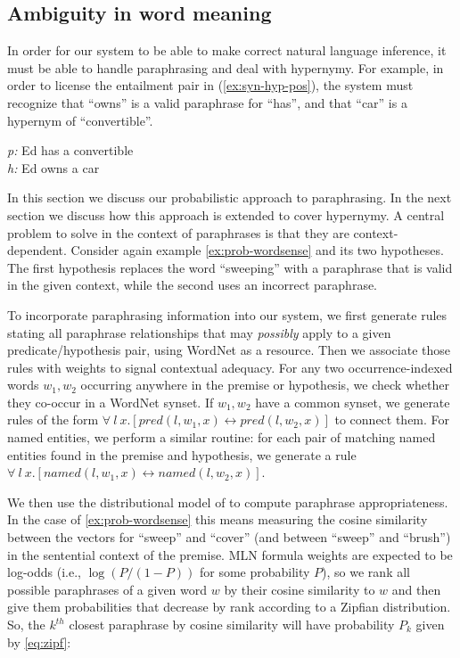 \subsection*{Ambiguity in word meaning}

In order for our system to be able to make correct natural language inference,
it must be able to handle paraphrasing and deal with hypernymy.  For example,
in order to license the entailment pair in (\ref{ex:syn-hyp-pos}), the system must
recognize that ``owns'' is a valid paraphrase for ``has'', and that ``car'' is a hypernym
of ``convertible''.

\begin{example}\label{ex:syn-hyp-pos}
{\it p:} Ed has a convertible \\
{\it h:} Ed owns a car
\end{example}

In this section we discuss our probabilistic approach to paraphrasing.
In the next section we discuss how this approach is extended to cover
hypernymy. A central problem to solve in the context of paraphrases is
that they are context-dependent. Consider again example
\eqref{ex:prob-wordsense} and its two hypotheses.  The first
hypothesis replaces the word ``sweeping'' with a paraphrase that is
valid in the given context, while the second uses an incorrect
paraphrase. 

To incorporate paraphrasing information into our system, we first
generate rules stating all paraphrase relationships that may
\emph{possibly} apply to a given predicate/hypothesis pair, using
WordNet  \citep{miller:wordnet2009} as a resource. Then we
associate those rules with weights to signal contextual adequacy. For
any two occurrence-indexed words $w_1, w_2$ occurring anywhere in the
premise or hypothesis, we check
whether they co-occur in a WordNet synset. If $w_1, w_2$ have a common synset, 
we generate rules of the form $\forall~l~x.[pred(l,w_1,x) \leftrightarrow
pred(l,w_2,x)]$ to connect them. For named entities, we perform a similar routine:
for each pair of matching named entities found in the premise and hypothesis, we
generate a rule  $\forall~l~x.[named(l,w_1,x) \leftrightarrow named(l,w_2,x)]$.

We then use the distributional model of \citet{erk:acl2010} to compute
paraphrase appropriateness. In the case of \eqref{ex:prob-wordsense}
this means measuring the cosine similarity between the vectors for
``sweep'' and ``cover'' (and between ``sweep'' and ``brush'') in the
sentential context of the premise. MLN formula weights are expected
to be log-odds (i.e., $\log (P/(1-P))$ for some probability $P$), so we
rank all possible paraphrases of a given word $w$ by their cosine similarity
to $w$ and then give them probabilities that decrease by rank according to a
Zipfian distribution.  So, the $k^{th}$ closest paraphrase by cosine similarity
will have probability $P_k$ given by \eqref{eq:zipf}:

